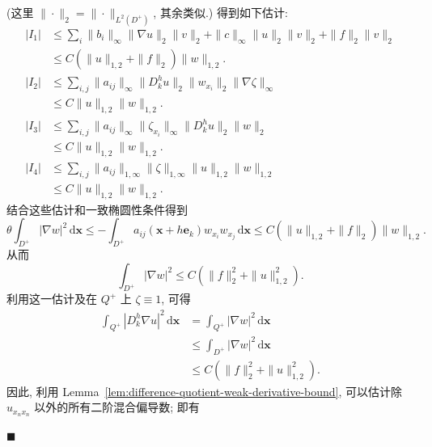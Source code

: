 \begingroup
\renewcommand{\endProof}{\par\nobreak\hfill$\blacksquare$\par\vspace{0.1cm}}
\begingroup
\renewenvironment{Proof}{\par}{\par\nobreak\hfill$\blacksquare$\par\vspace{0.1cm}}
\begin{Proof}
(这里 $\|\cdot\|_2=\|\cdot\|_{L^2(D^+)}$, 其余类似.) 得到如下估计:\[\begin{aligned}
|I_1|&\leq\sum_i\|b_i\|_\infty\|\nabla u\|_2\|v\|_2+\|c\|_\infty\|u\|_2\|v\|_2+\|f\|_2\|v\|_2\\
&\leq C(\|u\|_{1,2}+\|f\|_2)\|w\|_{1,2}.\\[1ex]
|I_2|&\leq\sum_{i,j}\|a_{ij}\|_\infty\|D_k^hu\|_2\|w_{x_i}\|_2\|\nabla\zeta\|_\infty\\
&\leq C\|u\|_{1,2}\|w\|_{1,2}.\\[1ex]
|I_3|&\leq\sum_{i,j}\|a_{ij}\|_\infty\|\zeta_{x_i}\|_\infty\|D_k^hu\|_2\|w\|_2\\
&\leq C\|u\|_{1,2}\|w\|_{1,2}.\\[1ex]
|I_4|&\leq\sum_{i,j}\|a_{ij}\|_{1,\infty}\|\zeta\|_{1,\infty}\|u\|_{1,2}\|w\|_{1,2}\\
&\leq C\|u\|_{1,2}\|w\|_{1,2}.
\end{aligned}\]结合这些估计和一致椭圆性条件得到
\begin{equation}\label{eq:flat-boundary-coercive-localized-gradient-estimate}
\theta\int_{D^+}|\nabla w|^2\,\mathrm{d}\bm{x}\leq-\int_{D^+}a_{ij}(\bm{x}+h\bm{e}_k)w_{x_i}w_{x_j}\,\mathrm{d}\bm{x}\leq C(\|u\|_{1,2}+\|f\|_2)\|w\|_{1,2}.
\end{equation}
从而
\begin{equation}\label{eq:flat-boundary-localized-gradient-l2-bound}
\int_{D^+}|\nabla w|^2\leq C(\|f\|_2^2+\|u\|_{1,2}^2).
\end{equation}
利用这一估计及在 $Q^+$ 上 $\zeta\equiv1$, 可得\[\begin{aligned}
\int_{Q^+}|D_k^h\nabla u|^2\,\mathrm{d}\bm{x}&=\int_{Q^+}|\nabla w|^2\,\mathrm{d}\bm{x}\\
&\leq\int_{D^+}|\nabla w|^2\,\mathrm{d}\bm{x}\\
&\leq C(\|f\|_2^2+\|u\|_{1,2}^2).
\end{aligned}\]因此, 利用 Lemma~\ref{lem:difference-quotient-weak-derivative-bound}, 可以估计除 $u_{x_nx_n}$ 以外的所有二阶混合偏导数; 即有

\end{Proof}

